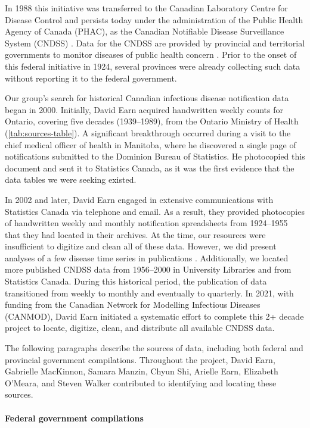 \documentclass[12pt]{article}
\begin{document}
In 1988 this initiative was transferred to the Canadian Laboratory Centre for Disease Control and persists today under the administration of the Public Health Agency of Canada (PHAC), as the Canadian Notifiable Disease Surveillance System (CNDSS) \cite{totten2019updates}. Data for the CNDSS are provided by provincial and territorial governments to monitor diseases of public health concern \cite{totten2019updates}. Prior to the onset of this federal initiative in 1924, several provinces were already collecting such data without reporting it to the federal government.

Our group's search for historical Canadian infectious disease notification data began in 2000. Initially, David Earn acquired handwritten weekly counts for Ontario, covering five decades (1939--1989), from the Ontario Ministry of Health (\cref{tab:sources-table}). A significant breakthrough occurred during a visit to the chief medical officer of health in Manitoba, where he discovered a single page of notifications submitted to the Dominion Bureau of Statistics. He photocopied this document and sent it to Statistics Canada, as it was the first evidence that the data tables we were seeking existed.

In 2002 and later, David Earn engaged in extensive communications with Statistics Canada via telephone and email. As a result, they provided photocopies of handwritten weekly and monthly notification spreadsheets from 1924--1955 that they had located in their archives. At the time, our resources were insufficient to digitize and clean all of these data. However, we did present analyses of a few disease time series in publications \cite{BaucEarn03,Hook+11}. Additionally, we located more published CNDSS data from 1956--2000 in University Libraries and from Statistics Canada. During this historical period, the publication of data transitioned from weekly to monthly and eventually to quarterly. In 2021, with funding from the Canadian Network for Modelling Infectious Diseases (CANMOD), David Earn initiated a systematic effort to complete this 2+ decade project to locate, digitize, clean, and distribute all available CNDSS data.

The following paragraphs describe the sources of data, including both federal and provincial government compilations. Throughout the project, David Earn, Gabrielle MacKinnon, Samara Manzin, Chyun Shi, Arielle Earn, Elizabeth O'Meara, and Steven Walker contributed to identifying and locating these sources.

\paragraph*{Federal government compilations}
\end{document}
